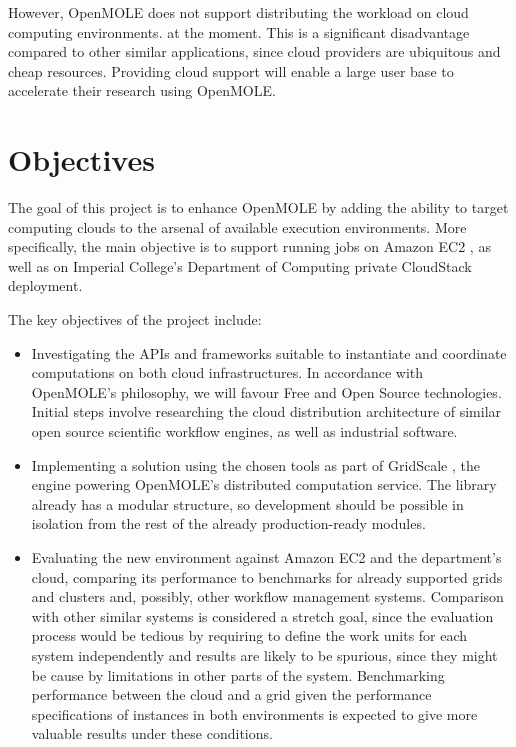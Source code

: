 \documentclass[11pt,a4paper]{report}
\begin{document}
However, OpenMOLE does not support distributing the workload on cloud computing environments. at the moment. This is a significant disadvantage compared to other similar applications, since cloud providers are ubiquitous and cheap resources. Providing cloud support will enable a large user base to accelerate their research using OpenMOLE.

\section{Objectives}

The goal of this project is to enhance OpenMOLE by adding the ability to target computing clouds to the arsenal of available execution environments. More specifically, the main objective is to support running jobs on Amazon EC2 \cite{EC2}, as well as on Imperial College's Department of Computing private CloudStack deployment.

The key objectives of the project include:

\begin{itemize}
	\item Investigating the APIs and frameworks suitable to instantiate and coordinate computations on both cloud infrastructures. In accordance with OpenMOLE's philosophy, we will favour Free and Open Source technologies. Initial steps involve researching the cloud distribution architecture of similar open source scientific workflow engines, as well as industrial software.
	\item Implementing a solution using the chosen tools as part of GridScale \cite{Passerat2016}, the engine powering OpenMOLE's distributed computation service. The library already has a modular structure, so development should be possible in isolation from the rest of the already production-ready modules.
	\item Evaluating the new environment against Amazon EC2 and the department's cloud, comparing its performance to benchmarks for already supported grids and clusters and, possibly, other workflow management systems. Comparison with other similar systems is considered a stretch goal, since the evaluation process would be tedious by requiring to define the work units for each system independently and results are likely to be spurious, since they might be cause by limitations in other parts of the system. Benchmarking performance between the cloud and a grid given the performance specifications of instances in both environments is expected to give more valuable results under these conditions.
\end{itemize}
\end{document}
